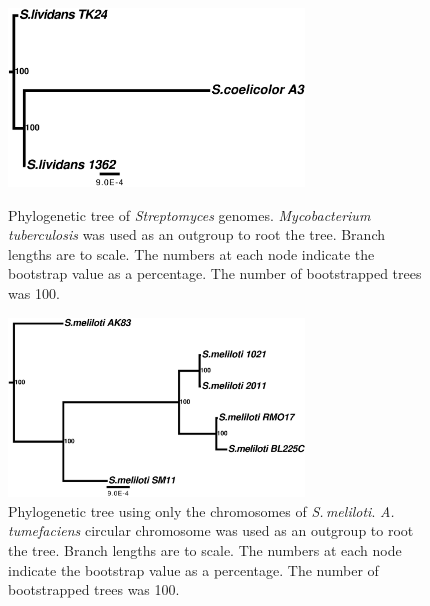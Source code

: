 \documentclass[11pt]{article}
\newcommand{\smel}{\textit{S.\,meliloti}\xspace}
\newcommand{\agro}{\textit{A.\,tumefaciens}\xspace}
\newcommand{\strep}{\textit{Streptomyces}\xspace}
\newcommand{\tub}{\textit{Mycobacterium tuberculosis}\xspace}
\begin{document}
		\begin{figure}[H]
		\begin{center}
			\includegraphics[width=0.7\textwidth]{./figs/strep_figtree_fig.pdf}
			\caption{\label{fig:streptree} Phylogenetic tree of \strep genomes. \tub was used as an outgroup to root the tree. Branch lengths are to scale. The numbers at each node indicate the bootstrap value as a percentage. The number of bootstrapped trees was 100.}
		\end{center}
			\vspace*{\floatsep}%
		\begin{center}
			\includegraphics[width=0.7\textwidth]{./figs/chrom_all_blocks_branchlengths_rooted_outtree.pdf}
			\caption{\label{fig:sinoCtree} Phylogenetic tree using only the chromosomes of \smel. \agro circular chromosome was used as an outgroup to root the tree. Branch lengths are to scale. The numbers at each node indicate the bootstrap value as a percentage. The number of bootstrapped trees was 100.}
		\end{center}
	\end{figure}
		
\end{document}
